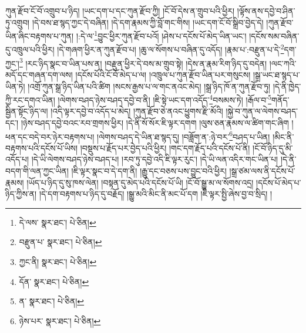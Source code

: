 ཀུན་རྫོབ་ངོ་བོ་འགྲུབ་པ་ཉིད། །ཡང་དག་པ་དང་ཀུན་རྫོབ་ཀྱི། །ངོ་བོ་དེས་ན་གྲུབ་པའི་ཕྱིར། །ལྟོས་ནས་དབྱེ་བ་ཤིན་ཏུ་འགྲུབ། །དེ་བས་ཐ་སྙད་ཀྱང་དེ་བཞིན། །དེ་དག་རྣམས་ཀྱི་བློ་གང་གིས། །ཡང་དག་ངོ་བོ་སྒྲིབ་བྱེད་དེ། །ཀུན་རྫོབ་ཡིན་ཞིང་བརྟགས་པ་ཀུན། །:དེ་ལ་\footnote{དེ་ལས་  སྣར་ཐང་།  པེ་ཅིན། }བྱུང་ཕྱིར་ཀུན་རྫོབ་པའོ། །ཤེས་པ་དངོས་པོ་མེད་ཡིན་ཡང་། །དངོས་སམ་བཞིན་དུ་འཁྲུལ་པའི་ཕྱིར། །དེ་གཞག་ཕྱིར་ན་ཀུན་རྫོབ་པ། །ཆུ་ལ་སོགས་པ་བཞིན་དུ་འདོད། །རྣམ་པ་:བརྫུན་པ་དེ་\footnote{བརྫུན་པ་  སྣར་ཐང་།  པེ་ཅིན། }དག་ཀྱང་།\footnote{ཀྱང་ནི།  སྣར་ཐང་།  པེ་ཅིན། } །རང་ཉིད་སྣང་བ་ཡིན་པས་ན། །བརྫུན་ཕྱིར་དེ་བས་མ་གྲུབ་སྟེ། །དེས་ན་རྣམ་རིག་ཉིད་དུ་བདེན། །ལང་ཀའི་མདོ་དང་གཞན་དག་ལས། །དངོས་པོའི་ངོ་བོ་མེད་པ་ལ། །འཁྲུལ་པ་ཀུན་རྫོབ་ཡིན་པར་གསུངས། །སྒྲ་ཡང་ཐ་སྙད་པ་ཡིན་ཏེ། །འགྲོ་ཀུན་སྒྲ་ཉིད་ཡིན་པའི་ཚིག །སངས་རྒྱས་པ་ལ་གང་ནའང་མེད། །སྒྲ་ཉིད་ཁོ་ན་ཀུན་རྫོབ་ཏུ། །དེ་ནི་ཁྱེད་ཀྱི་རང་དགའ་ཡིན། །ལེགས་བཤད་ཉེས་བཤད་དབྱེ་བ་ནི། །ཇི་སྟེ་ཡང་དག་འདོད་\footnote{དོན་  སྣར་ཐང་།  པེ་ཅིན། }བསམས་ཏེ། །རྒོལ་བ་\footnote{ན་  སྣར་ཐང་།  པེ་ཅིན། }གནོད་སྦྱིན་སྟོང་ཉིད་ལ། །འདི་ལྟར་དབྱེ་བ་འདོད་པ་མེད། །ཀུན་རྫོབ་ཅེ་ནའང་ཕྱུགས་རྫི་མོའི། །སྐྱེ་བ་ཀུན་ལ་ལེགས་བཤད་དང་། །ཉེས་བཤད་དབྱེ་བའང་རབ་གྲགས་ཕྱིར། །དེ་ནི་སོ་སོར་ཇི་ལྟར་དགག །ལུས་ཅན་རྣམས་ལ་ཚིག་གང་ཞིག །ཕན་དང་བདེ་བར་ཉེར་བརྟགས་པ། །ལེགས་བཤད་དེ་ཡིན་ཐ་སྙད་དུ། །བཟློག་ན་:ཉེ་བར་\footnote{ཉེས་པར་  སྣར་ཐང་།  པེ་ཅིན། }བཤད་པ་ཡིན། །མིང་ནི་བརྟགས་པའི་དངོས་པོ་ཡིས། །བསྡུས་པ་རྗོད་པར་བྱེད་པའི་ཕྱིར། །གང་དག་རྗོད་པའི་དངོས་པོ་ནི། །ངོ་བོ་ཉིད་དུ་མི་འདོད་པ། །དེ་ཡི་ལེགས་བཤད་ཉེས་བཤད་པ། །རབ་ཏུ་དབྱེ་འདི་ཇི་ལྟར་རུང་། །དེ་ཡི་ལན་འདིར་གང་ཡིན་པ། །དེ་ནི་བདག་གི་ལན་ཀྱང་ཡིན། །ཇི་ལྟར་སྣང་བ་དེ་དག་ནི། །རྒྱུ་དང་བཅས་པས་བྱུང་བའི་ཕྱིར། །སྒྲ་ཙམ་ལས་ནི་དངོས་པོ་རྣམས། །ཡོད་པ་ཉིད་དུ་སུ་ཁས་ལེན། །བསྟན་དུ་མེད་པའི་དངོས་པོ་ཡི། །ངོ་བོ་སྒྱུ་མ་ལ་སོགས་འདྲ། །དངོས་པོ་མེད་པ་ཉིད་ཀྱིས་ན། །དེ་དག་བརྟགས་པ་ཉིད་དུ་བརྗོད། །སྒྱུ་མའི་མིང་ནི་མང་པོ་དག །ཇི་ལྟར་སྤྱི་ཞེས་བྱ་བ་སྲིད། །
